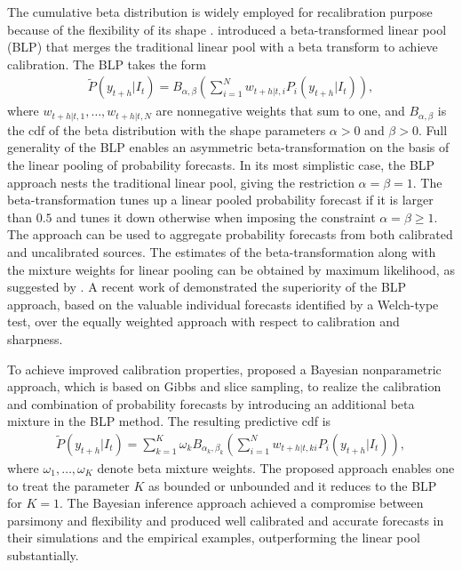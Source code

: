 \documentclass[11pt]{article}
\begin{document}
The cumulative beta distribution is widely employed for recalibration purpose because of the flexibility of its shape \citep[see, e.g.,][]{Graham1996-qc}. \citet{Ranjan2010-jl} introduced a beta-transformed linear pool (BLP) that merges the traditional linear pool with a beta transform to achieve calibration. The BLP takes the form
\begin{align*}
\tilde{P}(y_{t+h}|I_{t}) = B_{\alpha, \beta}\left(\sum_{i=1}^{N} w_{t+h|t,i} P_{i}(y_{t+h}|I_{t})\right),
\end{align*}
where $w_{t+h|t,1},\ldots,w_{t+h|t,N}$ are nonnegative weights that sum to one, and $B_{\alpha, \beta}$ is the cdf of the beta distribution with the shape parameters $\alpha > 0$ and $\beta > 0$. Full generality of the BLP enables an asymmetric beta-transformation on the basis of the linear pooling of probability forecasts. In its most simplistic case, the BLP approach nests the traditional linear pool, giving the restriction $\alpha = \beta = 1$. The beta-transformation tunes up a linear pooled probability forecast if it is larger than $0.5$ and tunes it down otherwise when imposing the constraint $\alpha = \beta \geq 1$. The approach can be used to aggregate probability forecasts from both calibrated and uncalibrated sources. The estimates of the beta-transformation along with the mixture weights for linear pooling can be obtained by maximum likelihood, as suggested by \citet{Ranjan2010-jl}. A recent work of \citet{Lahiri2015-qq} demonstrated the superiority of the BLP approach, based on the valuable individual forecasts identified by a Welch-type test, over the equally weighted approach with respect to calibration and sharpness.

To achieve improved calibration properties, \citet{Bassetti2018-qr} proposed a Bayesian nonparametric approach, which is based on Gibbs and slice sampling, to realize the calibration and combination of probability forecasts by introducing an additional beta mixture in the BLP method. The resulting predictive cdf is
\begin{align*}
\tilde{P}(y_{t+h}|I_{t}) = \sum_{k=1}^{K} \omega_{k} B_{\alpha_{k}, \beta_{k}}\left(\sum_{i=1}^{N} w_{t+h|t,ki} P_{i}(y_{t+h}|I_{t})\right),
\end{align*}
where $\omega_{1}, \ldots, \omega_{K}$ denote beta mixture weights. The proposed approach enables one to treat the parameter $K$ as bounded or unbounded and it reduces to the BLP for $K=1$. The Bayesian inference approach achieved a compromise between parsimony and flexibility and produced well calibrated and accurate forecasts in their simulations and the empirical examples, outperforming the linear pool substantially.
\end{document}
